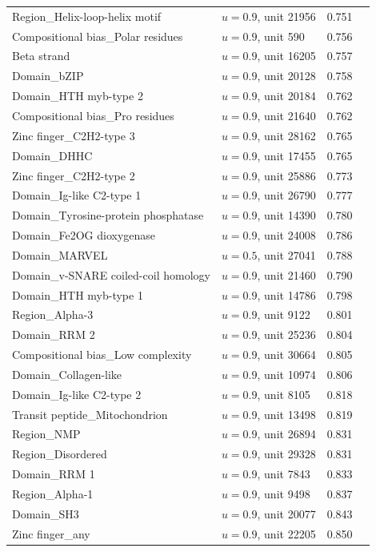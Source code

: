 \documentclass{article}
\begin{document}
\begin{longtable}{p{6.2cm}p{1.6cm}rr}
Region\_Helix-loop-helix motif & $u{=}0.9$, unit 21956 & 0.751 \\
Compositional bias\_Polar residues & $u{=}0.9$, unit 590 & 0.756 \\
Beta strand & $u{=}0.9$, unit 16205 & 0.757 \\
Domain\_bZIP & $u{=}0.9$, unit 20128 & 0.758 \\
Domain\_HTH myb-type 2 & $u{=}0.9$, unit 20184 & 0.762 \\
Compositional bias\_Pro residues & $u{=}0.9$, unit 21640 & 0.762 \\
Zinc finger\_C2H2-type 3 & $u{=}0.9$, unit 28162 & 0.765 \\
Domain\_DHHC & $u{=}0.9$, unit 17455 & 0.765 \\
Zinc finger\_C2H2-type 2 & $u{=}0.9$, unit 25886 & 0.773 \\
Domain\_Ig-like C2-type 1 & $u{=}0.9$, unit 26790 & 0.777 \\
Domain\_Tyrosine-protein phosphatase & $u{=}0.9$, unit 14390 & 0.780 \\
Domain\_Fe2OG dioxygenase & $u{=}0.9$, unit 24008 & 0.786 \\
Domain\_MARVEL & $u{=}0.5$, unit 27041 & 0.788 \\
Domain\_v-SNARE coiled-coil homology & $u{=}0.9$, unit 21460 & 0.790 \\
Domain\_HTH myb-type 1 & $u{=}0.9$, unit 14786 & 0.798 \\
Region\_Alpha-3 & $u{=}0.9$, unit 9122 & 0.801 \\
Domain\_RRM 2 & $u{=}0.9$, unit 25236 & 0.804 \\
Compositional bias\_Low complexity & $u{=}0.9$, unit 30664 & 0.805 \\
Domain\_Collagen-like & $u{=}0.9$, unit 10974 & 0.806 \\
Domain\_Ig-like C2-type 2 & $u{=}0.9$, unit 8105 & 0.818 \\
Transit peptide\_Mitochondrion & $u{=}0.9$, unit 13498 & 0.819 \\
Region\_NMP & $u{=}0.9$, unit 26894 & 0.831 \\
Region\_Disordered & $u{=}0.9$, unit 29328 & 0.831 \\
Domain\_RRM 1 & $u{=}0.9$, unit 7843 & 0.833 \\
Region\_Alpha-1 & $u{=}0.9$, unit 9498 & 0.837 \\
Domain\_SH3 & $u{=}0.9$, unit 20077 & 0.843 \\
Zinc finger\_any & $u{=}0.9$, unit 22205 & 0.850 \\

\end{longtable}
\end{document}
